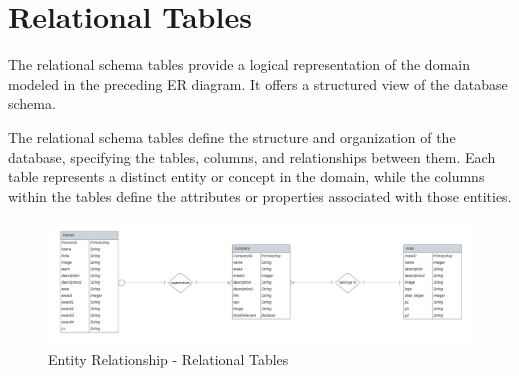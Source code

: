 \documentclass[../../DD.tex]{subfiles}
\begin{document}
\newpage
\section{Relational Tables}
	The relational schema tables provide a logical representation of the domain modeled in the preceding ER diagram. It offers a structured view of the database schema.

    The relational schema tables define the structure and organization of the database, specifying the tables, columns, and relationships between them. Each table represents a distinct entity or concept in the domain, while the columns within the tables define the attributes or properties associated with those entities.
	
	\begin{figure}[h]
	    \centering
	    \includegraphics[width=\textwidth]{Images/Database/Database ER diagram (crow's foot).pdf}
	    \caption{Entity Relationship - Relational Tables}
	    \label{fig: ER}
	\end{figure}
	
\end{document}
